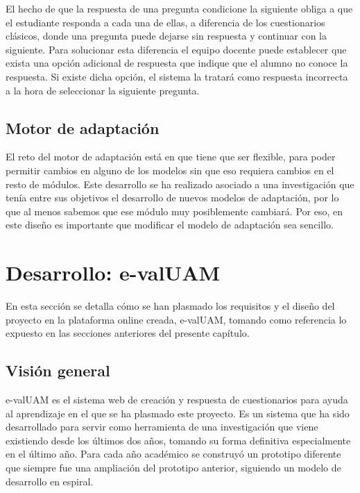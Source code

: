 El hecho de que la respuesta de una pregunta condicione la siguiente obliga a que el estudiante responda a cada una de ellas, a diferencia de los cuestionarios clásicos, donde una pregunta puede dejarse sin respuesta y continuar con la siguiente. Para solucionar esta diferencia el equipo docente puede establecer que exista una opción adicional de respuesta que indique que el alumno no conoce la respuesta. Si existe dicha opción, el sistema la tratará como respuesta incorrecta a la hora de seleccionar la siguiente pregunta.


\subsection{Motor de adaptación}

El reto del motor de adaptación está en que tiene que ser flexible, para poder permitir cambios en alguno de los modelos sin que eso requiera cambios en el resto de módulos. Este desarrollo se ha realizado asociado a una investigación que tenía entre sus objetivos el desarrollo de nuevos modelos de adaptación, por lo que al menos sabemos que ese módulo muy posiblemente cambiará. Por eso, en este diseño es importante que modificar el modelo de adaptación sea sencillo.



\section{Desarrollo: e-valUAM\label{sec:desarrollo}}

En esta sección se detalla cómo se han plasmado los requisitos y el diseño del proyecto en la plataforma online creada, \acrshort{e-valUAM}, tomando como referencia lo expuesto en las secciones anteriores del presente capítulo.

\subsection{Visión general}

\acrshort{e-valUAM} es el sistema web de creación y respuesta de cuestionarios para ayuda al aprendizaje en el que se ha plasmado este proyecto. Es un sistema que ha sido desarrollado para servir como herramienta de una investigación que viene existiendo desde los últimos dos años, tomando su forma definitiva especialmente en el último año. Para cada año académico se construyó un prototipo diferente que siempre fue una ampliación del prototipo anterior, siguiendo un modelo de desarrollo en espiral.

